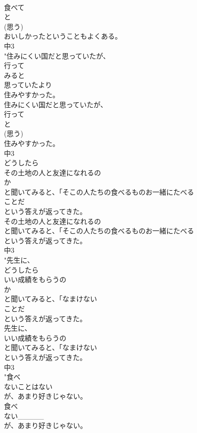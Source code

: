 \documentclass[8pt]{extreport}
\begin{document}
\begin{CJK}{UTF8}{min}
\\	食べて
\\	と
\\	(思う)
\\	おいしかったということもよくある。
\\	中3
\\	"住みにくい国だと思っていたが、
\\	行って
\\	みると
\\	思っていたより
\\	住みやすかった。
\\	住みにくい国だと思っていたが、
\\	行って
\\	と
\\	(思う)
\\	住みやすかった。
\\	中3
\\	どうしたら
\\	その土地の人と友達になれるの
\\	か
\\	と聞いてみると、「そこの人たちの食べるものお一緒にたべる
\\	ことだ
\\	という答えが返ってきた。
\\	その土地の人と友達になれるの
\\	と聞いてみると、「そこの人たちの食べるものお一緒にたべる
\\	という答えが返ってきた。
\\	中3
\\	"先生に、
\\	どうしたら
\\	いい成績をもらうの
\\	か
\\	と聞いてみると、「なまけない
\\	ことだ
\\	という答えが返ってきた。
\\	先生に、
\\	いい成績をもらうの
\\	と聞いてみると、「なまけない
\\	という答えが返ってきた。
\\	中3
\\	"食べ
\\	ないことはない
\\	が、あまり好きじゃない。
\\	食べ
\\	ない_____
\\	が、あまり好きじゃない。

\end{CJK}
\end{document}
